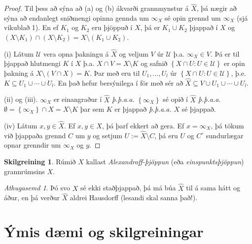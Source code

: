 \documentclass[a4paper,icelandic]{book}
\theoremstyle{definition}
\newtheorem{skilgr}{Skilgreining}[section]
\theoremstyle{plain}
\theoremstyle{remark}
\newtheorem*{ath}{Athugasemd}
\begin{document}
\begin{proof}
  Til þess að sýna að (a) og (b) ákvarði grannmynstur á $\hat X$, þá
  nægir að sýna að endanlegt sniðmengi opinna gennda um $\infty_X$ sé
  opin grennd um $\infty_X$ (sjá vikublað 1). En ef $K_1$ og $K_2$ eru
  þjöppuð í $X$, þá er $K_1\cup K_2$ þjappað í $X$ og $(X\setminus
  K_1)\cap (X\setminus K_2) = X\setminus (K_1\cup K_2)$.

  (i) Látum $\mathcal U$ vera opna þakningu á $\hat X$ og veljum $V$ úr
  $\mathcal U$ þ.a. $\infty_X\in V$. Þá er til þjappað hlutmengi $K$ í
  $X$ þ.a. $X\cap V = X\setminus K$ og safnið $\left\{ X\cap U :
  U\in\mathcal U \right\}$ er opin þakning á $X\setminus (V\cap X) = K$.
  Þar með eru til $U_1,\dots,U_l$ úr $\left\{ X\cap U : U\in\mathcal U
  \right\}$, þ.e. $K\subseteq U_1\cup\cdots\cup U_l$. En það hefur
  bersýnilega í för með sér að $\hat X \subseteq V\cup U_1\cup\cdots\cup
  U_l$.

  (ii) og (iii). $\infty_X$ er einangraður í $\hat X$ \emph{þ.þ.a.a.}
  $\left\{ \infty_X \right\}$ sé opið í $\hat X$ \emph{þ.þ.a.a.}
  $\emptyset = \left\{ \infty_X \right\}\cap X = X\setminus K$ þar sem
  $K$ er þjappað \emph{þ.þ.a.a.} $X$ sé þjappað.

  (iv) Látum $x, y\in \hat X$. Ef $x,y\in X$, þá þarf ekkert að gera. Ef
  $x = \infty_X$, þá tökum við þjappaða grennd $C$ um $y$ og setjum $U
  :=\hat X\setminus C$, þá eru $U$ og $C^\circ$ sundurlægar opnar
  grenndir um $\infty_X$ og $y$.
\end{proof}
\begin{skilgr}
  Rúmið $\hat X$ kallast
  \emph{Alexandroff-þjöppun} (eða
  \emph{einspunktsþjöppun}) grannrúmsins $X$.
\end{skilgr}
\begin{ath}
  Þó svo $X$ sé ekki staðþjappað, þá má búa $\hat X$ til á sama hátt og
  áður, en þá verður $\hat X$ aldrei Hausdorff (lesandi skal sanna það!).
\end{ath}


\chapter{Ýmis dæmi og skilgreiningar}
\end{document}
